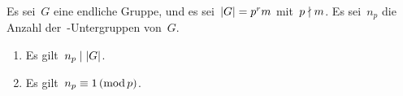 \begin{theorem}
  Es sei~$G$ eine endliche Gruppe, und es sei~$\lvert G\rvert = p^r m$ mit~$p \nmid m$.
  Es sei~$n_p$ die Anzahl der~-Untergruppen von~$G$.
  \begin{enumerate}
    \item
      Es gilt~$n_p \mid \lvert G\rvert$.
    \item
      Es gilt~$n_p \equiv 1 \,(\operatorname{mod} p)$.
  \end{enumerate}
\end{theorem}



